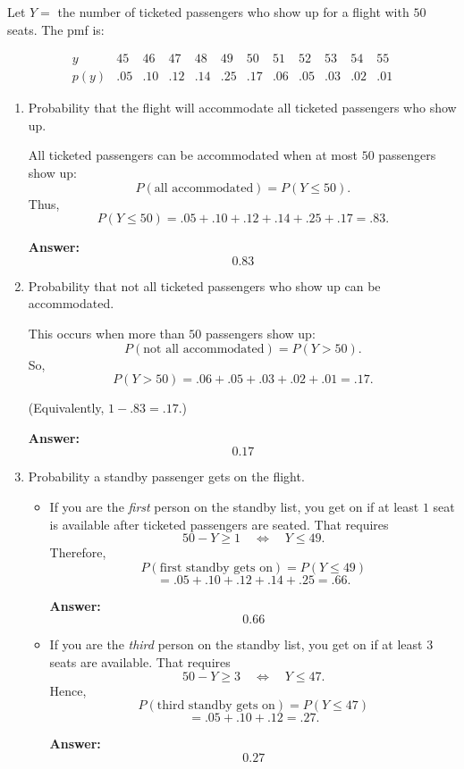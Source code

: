 \documentclass[11pt]{article}
\begin{document}
Let \(Y=\) the number of ticketed passengers who show up for a flight with \(50\) seats.  
The pmf is:

\[
\begin{array}{c|ccccccccccc}
y      & 45 & 46 & 47 & 48 & 49 & 50 & 51 & 52 & 53 & 54 & 55 \\ \hline
p(y)   & .05 & .10 & .12 & .14 & .25 & .17 & .06 & .05 & .03 & .02 & .01
\end{array}
\]

\begin{enumerate}
    \item[(a)] Probability that the flight will accommodate all ticketed passengers who show up.

    All ticketed passengers can be accommodated when at most \(50\) passengers show up:
    \[
    P(\text{all accommodated})=P(Y\le 50).
    \]
    Thus,
    \[
    P(Y\le 50)=.05+.10+.12+.14+.25+.17=.83.
    \]

    \textbf{Answer:}
    \[
    \boxed{0.83}
    \]

    \item[(b)] Probability that not all ticketed passengers who show up can be accommodated.

    This occurs when more than \(50\) passengers show up:
    \[
    P(\text{not all accommodated})=P(Y>50).
    \]
    So,
    \[
    P(Y>50)=.06+.05+.03+.02+.01=.17.
    \]

    (Equivalently, \(1-.83=.17\).)

    \textbf{Answer:}
    \[
    \boxed{0.17}
    \]

    \item[(c)] Probability a standby passenger gets on the flight.

    \begin{itemize}
        \item If you are the \emph{first} person on the standby list, you get on if at least \(1\) seat is available after ticketed passengers are seated.  
        That requires
        \[
        50-Y \ge 1 \quad \Longleftrightarrow \quad Y\le 49.
        \]
        Therefore,
        \[
        P(\text{first standby gets on})=P(Y\le 49)
        \]
        \[
        =.05+.10+.12+.14+.25=.66.
        \]

        \textbf{Answer:}
        \[
        \boxed{0.66}
        \]

        \item If you are the \emph{third} person on the standby list, you get on if at least \(3\) seats are available.  
        That requires
        \[
        50-Y \ge 3 \quad \Longleftrightarrow \quad Y\le 47.
        \]
        Hence,
        \[
        P(\text{third standby gets on})=P(Y\le 47)
        \]
        \[
        =.05+.10+.12=.27.
        \]

        \textbf{Answer:}
        \[
        \boxed{0.27}
        \]
    \end{itemize}
\end{enumerate}
\end{document}
